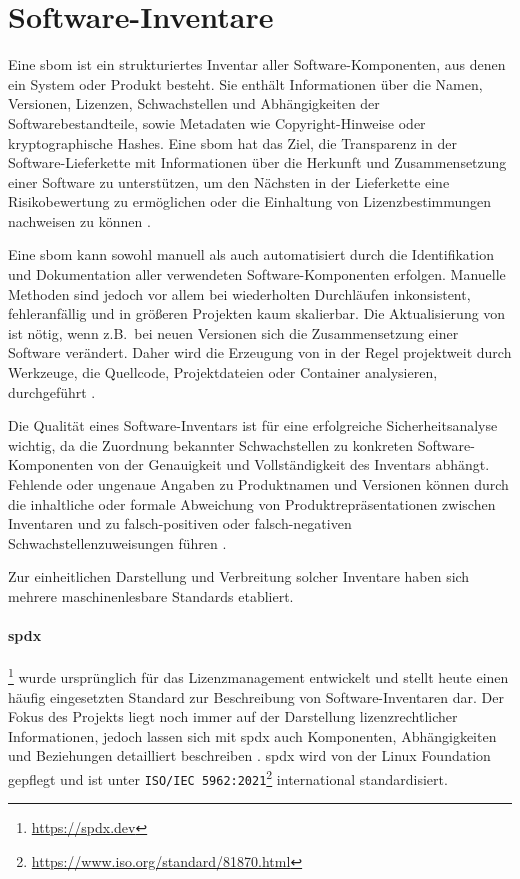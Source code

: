 \section{Software-Inventare}\label{sec:def-inventories}

Eine \acrfull{sbom} ist ein strukturiertes Inventar aller Software-Komponenten, aus denen ein System oder Produkt besteht.
Sie enthält Informationen über die Namen, Versionen, Lizenzen, Schwachstellen und Abhängigkeiten der Softwarebestandteile, sowie Metadaten wie Copyright-Hinweise oder kryptographische Hashes.
Eine \acrshort{sbom} hat das Ziel, die Transparenz in der Software-Lieferkette mit Informationen über die Herkunft und Zusammensetzung einer Software zu unterstützen, um den Nächsten in der Lieferkette eine Risikobewertung zu ermöglichen oder die Einhaltung von Lizenzbestimmungen nachweisen zu können \autocite{Bi_Xia_Xing_Lu_Zhu_2023}.

Eine \acrshort{sbom} kann sowohl manuell als auch automatisiert durch die Identifikation und Dokumentation aller verwendeten Software-Komponenten erfolgen.
Manuelle Methoden sind jedoch vor allem bei wiederholten Durchläufen inkonsistent, fehleranfällig und in größeren Projekten kaum skalierbar.
Die Aktualisierung von  ist nötig, wenn z.B.\ bei neuen Versionen sich die Zusammensetzung einer Software verändert.
Daher wird die Erzeugung von  in der Regel projektweit durch Werkzeuge, die Quellcode, Projektdateien oder Container analysieren, durchgeführt \autocite{Bi_Xia_Xing_Lu_Zhu_2023}.

Die Qualität eines Software-Inventars ist für eine erfolgreiche Sicherheitsanalyse wichtig, da die Zuordnung bekannter Schwachstellen zu konkreten Software-Komponenten von der Genauigkeit und Vollständigkeit des Inventars abhängt.
Fehlende oder ungenaue Angaben zu Produktnamen und Versionen können durch die inhaltliche oder formale Abweichung von Produktrepräsentationen zwischen Inventaren und  zu falsch-positiven oder falsch-negativen Schwachstellenzuweisungen führen \autocite{Idrissi_Sebai_Faroukhi_Mahouachi_2024}.

Zur einheitlichen Darstellung und Verbreitung solcher Inventare haben sich mehrere maschinenlesbare Standards etabliert.

\paragraph{\acrfull{spdx}}\footnote{\url{https://spdx.dev}}
wurde ursprünglich für das Lizenzmanagement entwickelt und stellt heute einen häufig eingesetzten Standard zur Beschreibung von Software-Inventaren dar.
Der Fokus des Projekts liegt noch immer auf der Darstellung lizenzrechtlicher Informationen, jedoch lassen sich mit \acrshort{spdx} auch Komponenten, Abhängigkeiten und Beziehungen detailliert beschreiben \autocite{spdxOverview1june2024}.
\acrshort{spdx} wird von der Linux Foundation gepflegt und ist unter \texttt{ISO/IEC 5962:2021}\footnote{\url{https://www.iso.org/standard/81870.html}} international standardisiert.

